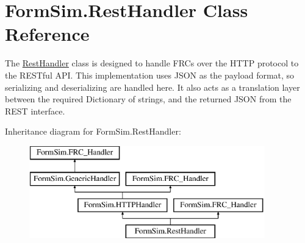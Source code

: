 \hypertarget{class_form_sim_1_1_rest_handler}{}\section{Form\+Sim.\+Rest\+Handler Class Reference}
\label{class_form_sim_1_1_rest_handler}


The \mbox{\hyperlink{class_form_sim_1_1_rest_handler}{Rest\+Handler}} class is designed to handle F\+RC\textquotesingle{}s over the H\+T\+TP protocol to the R\+E\+S\+Tful A\+PI. This implementation uses J\+S\+ON as the payload format, so serializing and deserializing are handled here. It also acts as a translation layer between the required Dictionary of strings, and the returned J\+S\+ON from the R\+E\+ST interface.  


Inheritance diagram for Form\+Sim.\+Rest\+Handler\+:\begin{figure}[H]
\begin{center}
\leavevmode
\includegraphics[height=4.000000cm]{class_form_sim_1_1_rest_handler}
\end{center}
\end{figure}
